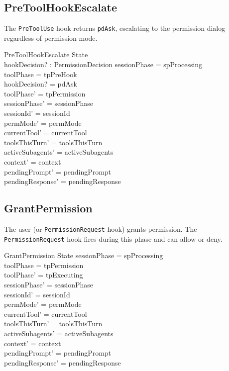 \documentclass[a4paper,10pt,fleqn]{article}
\begin{document}
\subsection{PreToolHookEscalate}

The \texttt{PreToolUse} hook returns \texttt{pdAsk}, escalating to
the permission dialog regardless of permission mode.

\begin{schema}{PreToolHookEscalate}
  \Delta State \\
  hookDecision? : PermissionDecision
  \where
  sessionPhase = spProcessing \\
  toolPhase = tpPreHook \\
  hookDecision? = pdAsk \\
  toolPhase' = tpPermission \\
  sessionPhase' = sessionPhase \\
  sessionId' = sessionId \\
  permMode' = permMode \\
  currentTool' = currentTool \\
  toolsThisTurn' = toolsThisTurn \\
  activeSubagents' = activeSubagents \\
  context' = context \\
  pendingPrompt' = pendingPrompt \\
  pendingResponse' = pendingResponse
\end{schema}

\subsection{GrantPermission}

The user (or \texttt{PermissionRequest} hook) grants permission.
The \texttt{PermissionRequest} hook fires during this phase and
can allow or deny.

\begin{schema}{GrantPermission}
  \Delta State
  \where
  sessionPhase = spProcessing \\
  toolPhase = tpPermission \\
  toolPhase' = tpExecuting \\
  sessionPhase' = sessionPhase \\
  sessionId' = sessionId \\
  permMode' = permMode \\
  currentTool' = currentTool \\
  toolsThisTurn' = toolsThisTurn \\
  activeSubagents' = activeSubagents \\
  context' = context \\
  pendingPrompt' = pendingPrompt \\
  pendingResponse' = pendingResponse
\end{schema}
\end{document}

